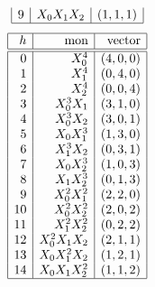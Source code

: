 \begin{table}
\begin{tcolorbox}
\begin{tcbitemize}[raster columns=3,raster equal height,
  colframe=red!75!black,colback=red!5!white,fonttitle=\bfseries]
$$\begin{array}{|r|r|r|}
9 & X_0X_1X_2 & ( 1, 1, 1 )\\
\hline
\end{array}
$$
\tcbitem[squeezed title*={Degree 4}] 
$$
\begin{array}{|r|r|r|}
\hline
h &  \mbox{mon} & \mbox{vector} \\
\hline
\hline
0 & X_0^4 & ( 4, 0, 0 )\\
1 & X_1^4 & ( 0, 4, 0 )\\
2 & X_2^4 & ( 0, 0, 4 )\\
3 & X_0^3X_1 & ( 3, 1, 0 )\\
4 & X_0^3X_2 & ( 3, 0, 1 )\\
5 & X_0X_1^3 & ( 1, 3, 0 )\\
6 & X_1^3X_2 & ( 0, 3, 1 )\\
7 & X_0X_2^3 & ( 1, 0, 3 )\\
8 & X_1X_2^3 & ( 0, 1, 3 )\\
9 & X_0^2X_1^2 & ( 2, 2, 0 )\\
10 & X_0^2X_2^2 & ( 2, 0, 2 )\\
11 & X_1^2X_2^2 & ( 0, 2, 2 )\\
12 & X_0^2X_1X_2 & ( 2, 1, 1 )\\
13 & X_0X_1^2X_2 & ( 1, 2, 1 )\\
14 & X_0X_1X_2^2 & ( 1, 1, 2 )\\
\hline
\end{array}
$$
\end{tcbitemize}
\end{tcolorbox}
\caption{\label{tab:PG2monomials}Monomial Ordering of Partition Type in the Plane}
\end{table}
